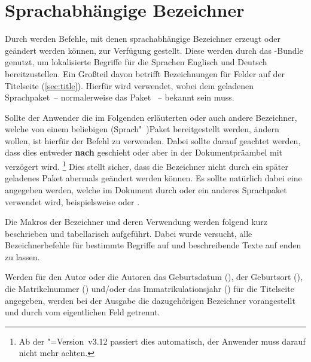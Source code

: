 \documentclass[%
  english,ngerman,%
  headings=optiontoheadandtoc,captions=tableheading,numbers=noenddot,%
  chapterpage,cdfoot,%
]{tudscrman}
\begin{document}
\section{Sprachabhängige Bezeichner}
\label{sec:localization}
%
%
Durch \KOMAScript{} werden Befehle, mit denen sprachabhängige Bezeichner erzeugt 
oder geändert werden können, zur Verfügung gestellt. Diese werden durch das 
\TUDScript-Bundle genutzt, um lokalisierte Begriffe für die Sprachen Englisch 
und Deutsch bereitzustellen. Ein Großteil davon betrifft Bezeichnungen für 
Felder auf der Titelseite (\autoref{sec:title}). Hierfür wird
verwendet, wobei  dem geladenen Sprachpaket~-- normalerweise das 
Paket ~-- bekannt sein muss.

Sollte der Anwender die im Folgenden erläuterten oder auch andere Bezeichner, 
welche von einem beliebigen (Sprach"~)Paket bereitgestellt werden, ändern 
wollen, ist hierfür der Befehl
zu verwenden. Dabei sollte darauf geachtet werden, dass dies entweder 
\textbf{nach}  geschieht oder aber in der 
Dokumentpräambel mit \PParameter{\dots} verzögert wird.%
\footnote{%
  Ab der \KOMAScript"=Version~v3.12 passiert dies automatisch, der Anwender muss 
  darauf nicht mehr achten.%
}
Dies stellt sicher, dass die Bezeichner nicht durch ein später geladenes Paket 
abermals geändert werden können. Es sollte natürlich dabei eine  
angegeben werden, welche im Dokument durch  oder ein anderes 
Sprachpaket verwendet wird, beispielsweise  oder 
. 

Die Makros der Bezeichner und deren Verwendung werden folgend kurz beschrieben 
und tabellarisch aufgeführt. Dabei wurde versucht, alle Bezeichnerbefehle für 
bestimmte Begriffe auf  und beschreibende Texte auf 
 enden zu lassen.
%
\begin{Declaration}{}
\begin{Declaration}{}
\begin{Declaration}{}
\begin{Declaration}{}
\printdeclarationlist%
%
%
Werden für den Autor oder die Autoren das Geburtsdatum (), 
der Geburtsort (), die Matrikelnummer 
() und/oder das Immatrikulationsjahr 
() für die Titelseite angegeben, werden bei der Ausgabe 
die dazugehörigen Bezeichner vorangestellt und durch  vom 
eigentlichen Feld getrennt.
\end{Declaration}
\end{Declaration}
\end{Declaration}
\end{Declaration}
\end{document}
